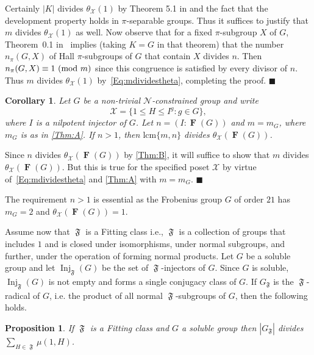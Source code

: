\documentclass[a4paper,12pt,reqno]{amsart}
\newtheorem{proposition}[theorem]{Proposition}
\newtheorem{corollary}[theorem]{Corollary}
\numberwithin{equation}{section}
\DeclareMathOperator{\FF}{\mathfrak{F}}
\DeclareMathOperator{\fitt}{\mathbf{F}}
\DeclareMathOperator{\inj}{Inj}
\newcommand{\card}[1]{\left\lvert{#1}\right\rvert}
\renewcommand{\leq}{\leqslant}
\newcommand{\md}[1]{\,\left(\textnormal{mod}\ #1\right)}
\newenvironment{proofof}{{\bf {Proof.} }}{\hfill $\blacksquare$ \\}
\begin{document}
\begin{proofof}
Certainly $\card{K}$ divides $\theta_{\mathcal{X}}(1)$
by Theorem 5.1 in \cite{mobius} and the fact that the development
property holds in $\pi$-separable groups.
Thus it suffices to justify that $m$ divides $\theta_{\mathcal{X}}(1)$ as well.
Now observe that for a fixed $\pi$-subgroup $X$ of $G$,
Theorem~0.1 in~\cite{arithmetical_questions} implies (taking $K = G$ in that theorem) 
that the number $n_{\pi}(G, X)$ of Hall $\pi$-subgroups of $G$ that contain $X$ divides $n$.
Then $n_{\pi}(G, X) \equiv 1 \md{m}$ 
since this congruence is satisfied by every divisor of $n$.
Thus $m$ divides $\theta_{\mathcal{X}}(1)$ by~\eqref{Eq:mdividestheta}, 
completing the proof.
\end{proofof}


\begin{corollary}\label{Cor:Third}
Let $G$ be a non-trivial $\mathcal{N}$-constrained group 
and write
\[
\mathcal{X} = \{1 \leq H \leq I^g : g \in G\},
\]
where $I$ is a nilpotent injector of $G$.
Let $n = (I : \fitt(G))$ and $m = m_G$,
where $m_G$ is as in \autoref{Thm:A}.
If $n > 1$, then $\mathrm{lcm}\{m,n\}$ divides $\theta_{\mathcal{X}}(\fitt(G))$.
\end{corollary}

\begin{proofof}
Since $n$ divides $\theta_{\mathcal{X}}(\fitt(G))$ by \autoref{Thm:B},
it will suffice to show that $m$ divides $\theta_{\mathcal{X}}(\fitt(G))$.
But this is true for the specified poset $\mathcal{X}$ by virtue of~\eqref{Eq:mdividestheta}
and \autoref{Thm:A} with $m = m_G$.
\end{proofof}

The requirement $n > 1$ is essential as the Frobenius group $G$ of order $21$ 
has $m_G = 2$ and $\theta_{\mathcal{X}}(\fitt(G)) = 1$.




Assume now that $\FF$ is a Fitting class
i.e.,  $\FF$ is  a collection of groups that includes $1$ and is closed under isomorphisms, under normal subgroups, and further, under the operation of forming normal products. 
Let $G$ be  a soluble group and let $\inj_{\FF}(G)$ be the set of $\FF$-injectors of $G$. 
Since $G$ is soluble, $\inj_{\FF}(G)$ is not empty and forms a single conjugacy class of $G$. 
If $G_{\FF}$ is the $\FF$-radical of $G$, 
i.e. the product of all normal $\FF$-subgroups of $G$, 
then the following holds.

\begin{proposition}
If $\FF$ is a Fitting class  and  $G$ a soluble group then   
$\card{G_{\FF}}$ divides $\sum_{H \in \FF} \mu(1, H)$.
\end{proposition}
\end{document}
